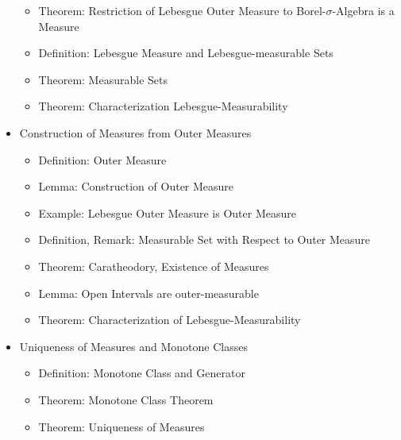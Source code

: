 \documentclass[8pt,twocolumn]{article}
\begin{document}
\begin{itemize}
\begin{itemize}
            \item Theorem: Restriction of Lebesgue Outer Measure to Borel-$\sigma$-Algebra is a Measure
            \item Definition: Lebesgue Measure and Lebesgue-measurable Sets
            \item Theorem: Measurable Sets
            \item Theorem: Characterization Lebesgue-Measurability
          \end{itemize}
        \item Construction of Measures from Outer Measures
          \begin{itemize}
            \item Definition: Outer Measure
            \item Lemma: Construction of Outer Measure
            \item Example: Lebesgue Outer Measure is Outer Measure
            \item Definition, Remark: Measurable Set with Respect to Outer Measure
            \item Theorem: Caratheodory, Existence of Measures
            \item Lemma: Open Intervals are outer-measurable
            \item Theorem: Characterization of Lebesgue-Measurability
          \end{itemize}
        \item Uniqueness of Measures and Monotone Classes
          \begin{itemize}
            \item Definition: Monotone Class and Generator
            \item Theorem: Monotone Class Theorem
            \item Theorem: Uniqueness of Measures
          \end{itemize}
      \end{itemize}
\end{document}
